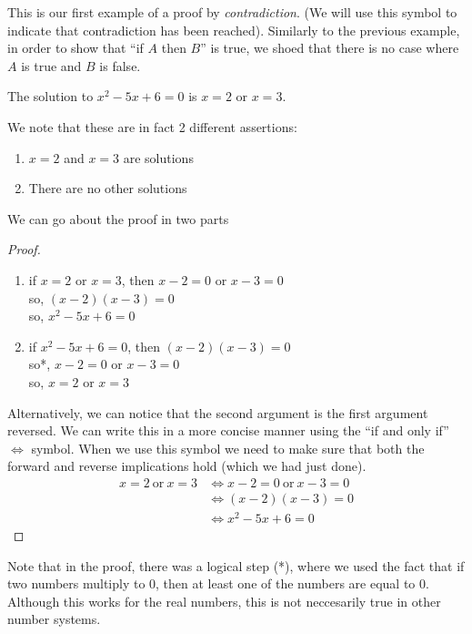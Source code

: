 \documentclass{article}
\begin{document}
This is our first example of a proof by \emph{contradiction}. (We will use this \contradiction symbol to indicate that contradiction has been reached). Similarly to the previous example, in order to show that ``if $A$ then $B$'' is true, we shoed that there is no case where $A$ is true and $B$ is false.


\begin{assert}
    The solution to $x^2 - 5x + 6 = 0$ is $x = 2$ or $x = 3$.
\end{assert}

We note that these are in fact 2 different assertions:
\begin{enumerate}
    \item $x = 2$ and $x = 3$ are solutions
    \item There are no other solutions
\end{enumerate}

We can go about the proof in two parts
\begin{proof}\leavevmode
    \begin{enumerate}
        \item if $x = 2$ or $x = 3$, then $x - 2 = 0$ or $x - 3 = 0$\\
        so, $(x - 2)(x - 3) = 0$\\
        so, $x^2 - 5x + 6 = 0$ 
        \item if $x^2 - 5x + 6 = 0$, then $(x - 2)(x - 3) = 0$\\
        so*, $x - 2 = 0$ or $x - 3 = 0$\\
        so, $x = 2$ or $x = 3$
    \end{enumerate}

    Alternatively, we can notice that the second argument is the first argument reversed. We can write this in a more concise manner using the ``if and only if'' $\Leftrightarrow$ symbol. When we use this symbol we need to make sure that both the forward and reverse implications hold (which we had just done).
    \begin{align*}
        x = 2 \ \text{or} \ x = 3&\Leftrightarrow x - 2 = 0 \ \text{or} \ x - 3 = 0\\
        &\Leftrightarrow (x - 2)(x - 3) = 0\\
        &\Leftrightarrow x^2 - 5x + 6 = 0
    \end{align*}
\end{proof}

Note that in the proof, there was a logical step (*), where we used the fact that if two numbers multiply to $0$, then at least one of the numbers are equal to $0$. Although this works for the real numbers, this is not neccesarily true in other number systems.
\end{document}
